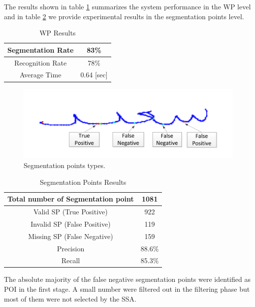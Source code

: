 \documentclass[journal,compsoc]{IEEEtran}
\begin{document}
The results shown in table \ref{table:wp_results} summarizes the system performance in the WP level and in table \ref{table:sp_results} we provide experimental results in the segmentation points level. 

\begin{table}[h]
\caption{WP Results}
\begin{tabular}{ | c | c | }
  \hline
  Segmentation Rate &  83\% \\ 
 \hline
  Recognition Rate &  78\% \\ 
 \hline
  Average Time & 0.64 [sec] \\
\hline
\end{tabular}
\centering
\label{table:wp_results} 
\end{table}

\begin{figure}
\centering
\includegraphics[width=0.9\columnwidth]{./figures/sp_types}
\caption{Segmentation points types.}
\label{fig:sp_types}
\end{figure}

\begin{table}[h]
\caption{Segmentation Points Results}
\begin{tabular}{ | c | c | }
  \hline
  Total number of Segmentation point & 1081 \\
  \hline
  Valid SP (True Positive) & 922 \\
  \hline
  Invalid SP (False Positive) & 119 \\
  \hline
  Missing SP (False Negative) & 159 \\
  \hline                                    
  Precision & 88.6\% \\ 
 \hline
  Recall &  85.3\% \\ 
 \hline
\end{tabular}
\centering
\label{table:sp_results} 
\end{table}

The absolute majority of the false negative segmentation points were identified as POI in the first stage. A small number were filtered out in the filtering phase but most of them were not selected by the SSA.
\end{document}
